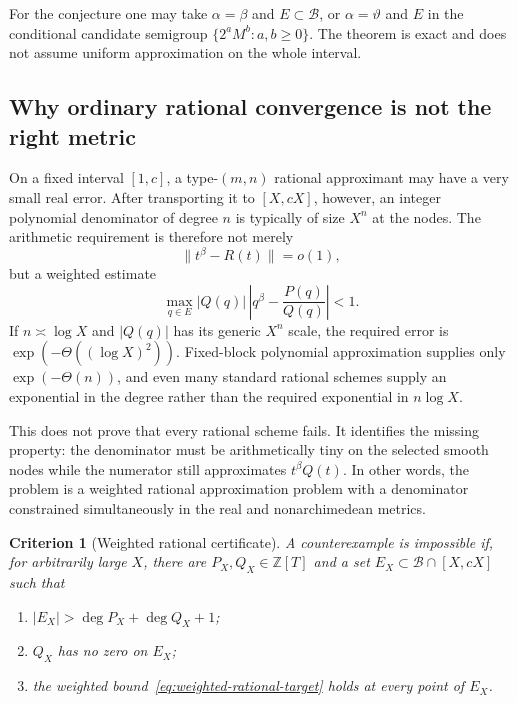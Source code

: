 \documentclass[11pt,oneside]{article}
\newtheorem{criterion}[theorem]{Criterion}
\theoremstyle{definition}
\theoremstyle{remark}
\newcommand{\Z}{\mathbb Z}
\newcommand{\Bsem}{\mathcal B}
\newcommand{\thetaq}{\vartheta}
\begin{document}
For the conjecture one may take $\alpha=\beta$ and $E\subset\Bsem$, or
$\alpha=\thetaq$ and $E$ in the conditional candidate semigroup
$\{2^aM^b:a,b\ge0\}$.  The theorem is exact and does not assume uniform approximation on the
whole interval.

\subsection{Why ordinary rational convergence is not the right metric}

On a fixed interval $[1,c]$, a type-$(m,n)$ rational approximant may have a very small real
error.  After transporting it to $[X,cX]$, however, an integer polynomial denominator of
degree $n$ is typically of size $X^n$ at the nodes.  The arithmetic requirement is therefore
not merely
\[
 \|t^\beta-R(t)\|=o(1),
\]
but a weighted estimate
\begin{equation}
 \max_{q\in E}|Q(q)|\,
 \left|q^\beta-\frac{P(q)}{Q(q)}\right|<1.
 \label{eq:weighted-rational-target}
\end{equation}
If $n\asymp\log X$ and $|Q(q)|$ has its generic $X^n$ scale, the required error is
$\exp(-\Theta((\log X)^2))$.  Fixed-block polynomial approximation supplies only
$\exp(-\Theta(n))$, and even many standard rational schemes supply an exponential in the
degree rather than the required exponential in $n\log X$.

This does not prove that every rational scheme fails.  It identifies the missing property:
the denominator must be arithmetically tiny on the selected smooth nodes while the numerator
still approximates $t^\beta Q(t)$.  In other words, the problem is a weighted rational
approximation problem with a denominator constrained simultaneously in the real and
nonarchimedean metrics.

\begin{criterion}[Weighted rational certificate]
\label{crit:weighted-rational}
A counterexample is impossible if, for arbitrarily large $X$, there are
$P_X,Q_X\in\Z[T]$ and a set
$E_X\subset\Bsem\cap[X,cX]$ such that
\begin{enumerate}
\item $|E_X|>\deg P_X+\deg Q_X+1$;
\item $Q_X$ has no zero on $E_X$;
\item the weighted bound~\eqref{eq:weighted-rational-target} holds at every point of $E_X$.
\end{enumerate}
\end{criterion}
\end{document}
